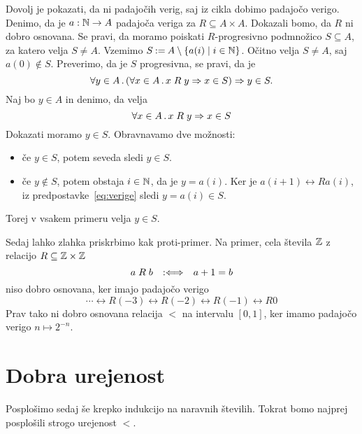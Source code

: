 \begin{dokaz}
  Dovolj je pokazati, da ni padajočih verig, saj iz cikla dobimo padajočo verigo.
  Denimo, da je $a : \mathbb{N} \to A$ padajoča veriga za $R \subseteq A \times A$. Dokazali bomo, da $R$ ni dobro
  osnovana. Se pravi, da moramo poiskati $R$-progresivno podmnožico $S \subseteq A$, za katero velja
  $S \neq A$. Vzemimo $S \mathbin{{:}{=}} A \setminus \left\{ a(i) \mid i \in \mathbb{N}\right\}$. Očitno velja $S \neq A$, saj 
  $a(0) \not\in S$. Preverimo, da je $S$ progresivna, se pravi, da je
  \begin{equation*}
    \forall y \in A \,.\, (\forall x \in A \,.\, x \mathrel{R} y \Rightarrow x \in S) \Rightarrow y \in S.
  \end{equation*}
  Naj bo $y \in A$ in denimo, da velja
  \begin{equation}
    \label{eq:verige}
    \forall x \in A \,.\, x \mathrel{R} y \Rightarrow x \in S
  \end{equation}
  Dokazati moramo $y \in S$. Obravnavamo dve možnosti:
  \begin{itemize}
  \item če $y \in S$, potem seveda sledi $y \in S$.
  \item če $y \not\in S$, potem obstaja $i \in \mathbb{N}$, da je $y = a(i)$. Ker je $a(i+1) \rel{R} a(i)$, iz
    predpostavke~\eqref{eq:verige} sledi $y = a(i) \in S$.
  \end{itemize}
  Torej v vsakem primeru velja $y \in S$.
\end{dokaz}

\begin{zgled}
  Sedaj lahko zlahka priskrbimo kak proti-primer. Na primer, cela števila $\mathbb{Z}$ z relacijo $R \subseteq \mathbb{Z} \times \mathbb{Z}$
  \begin{equation*}
    a \mathrel{R} b \quad {{:}{\Longleftrightarrow}}\quad a + 1 = b
  \end{equation*}
  niso dobro osnovana, ker imajo padajočo verigo
  \begin{equation*}
    \cdots \rel{R} (-3) \rel{R} (-2) \rel{R} (-1) \rel{R} 0
  \end{equation*}
  Prav tako ni dobro osnovana relacija $<$ na intervalu $[0,1]$, ker imamo padajočo verigo
  $n \mapsto 2^{-n}$.
\end{zgled}

\section{Dobra urejenost}

Posplošimo sedaj še krepko indukcijo na naravnih številih. Tokrat bomo najprej posplošili
strogo urejenost $<$.

